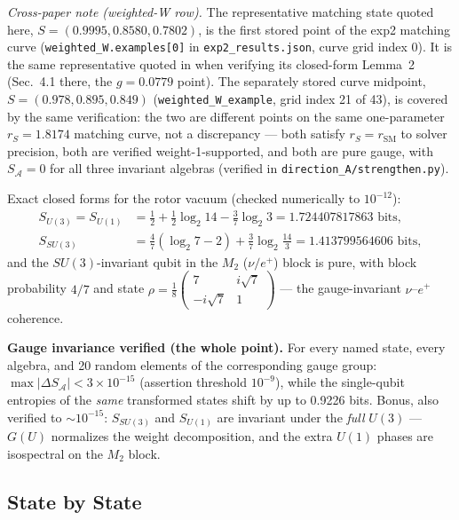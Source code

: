 \documentclass[11pt]{article}
\newcommand{\SA}{S_{\mathcal{A}}}
\newcommand{\rSM}{r_{\mathrm{SM}}}
\begin{document}
{\sloppy \emph{Cross-paper note (weighted-W row).} The representative matching state quoted here, $S = (0.9995, 0.8580, 0.7802)$, is the first stored point of the exp2 matching curve (\texttt{weighted\_W.examples[0]} in \texttt{exp2\_results.json}, curve grid index 0). It is the same representative quoted in \cite{companion} when verifying its closed-form Lemma~2 (Sec.~4.1 there, the $g = 0.0779$ point). The separately stored curve midpoint, $S = (0.978, 0.895, 0.849)$ (\texttt{weighted\_W\_example}, grid index 21 of 43), is covered by the same verification: the two are different points on the same one-parameter $r_S = 1.8174$ matching curve, not a discrepancy --- both satisfy $r_S = \rSM$ to solver precision, both are verified weight-1-supported, and both are pure gauge, with $\SA = 0$ for all three invariant algebras (verified in \texttt{direction\_A/strengthen.py}).\par}

Exact closed forms for the rotor vacuum (checked numerically to $10^{-12}$):
\begin{align*}
S_{U(3)} = S_{U(1)} &= \tfrac{1}{2} + \tfrac{1}{2}\log_2 14 - \tfrac{3}{7}\log_2 3 = 1.724407817863 \text{ bits}, \\
S_{SU(3)} &= \tfrac{4}{7}\left(\log_2 7 - 2\right) + \tfrac{3}{7}\log_2\!\frac{14}{3} = 1.413799564606 \text{ bits},
\end{align*}
and the $SU(3)$-invariant qubit in the $M_2$ ($\nu/e^+$) block is pure, with block probability $4/7$ and state $\rho = \frac{1}{8}\begin{pmatrix} 7 & i\sqrt{7} \\ -i\sqrt{7} & 1 \end{pmatrix}$ --- the gauge-invariant $\nu$--$e^+$ coherence.

\textbf{Gauge invariance verified (the whole point).} For every named state, every algebra, and 20 random elements of the corresponding gauge group: $\max |\Delta \SA| < 3 \times 10^{-15}$ (assertion threshold $10^{-9}$), while the single-qubit entropies of the \emph{same} transformed states shift by up to 0.9226 bits. Bonus, also verified to $\sim$$10^{-15}$: $S_{SU(3)}$ and $S_{U(1)}$ are invariant under the \emph{full} $U(3)$ --- $G(U)$ normalizes the weight decomposition, and the extra $U(1)$ phases are isospectral on the $M_2$ block.

\subsection{State by State}
\end{document}
